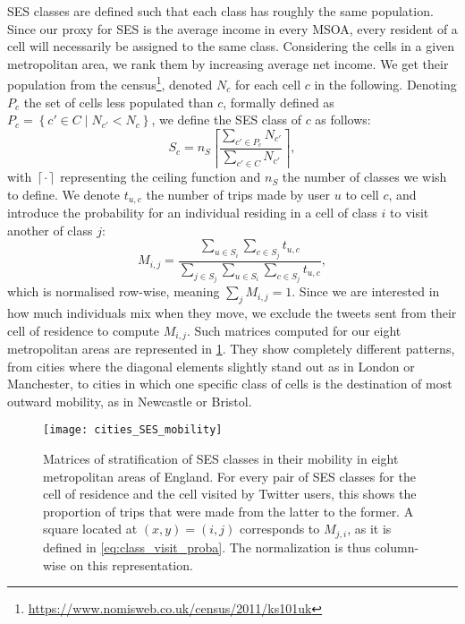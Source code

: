 \documentclass[../thesis.tex]{subfiles}
\begin{document}
\Ac{SES} classes are defined such that each class has roughly the same population. Since
our proxy for \ac{SES} is the average income in every \ac{MSOA}, every resident of a
cell will necessarily be assigned to the same class. Considering the cells in a given
metropolitan area, we rank them by increasing average net income. We get their
population from the
census\footnote{\url{https://www.nomisweb.co.uk/census/2011/ks101uk}}, denoted $N_c$ for
each cell $c$ in the following. Denoting $P_c$ the set of cells less populated than $c$,
formally defined as $P_c = \left\{ c' \in C \mid N_{c'} < N_c \right\}$, we define the
\ac{SES} class of $c$ as follows:
\begin{equation}
  S_c = n_S \left\lceil \frac{\sum_{c' \in P_c} N_{c'}}{\sum_{c' \in C} N_{c'}} \right\rceil,
\end{equation}
with $\left\lceil \cdot \right\rceil$ representing the ceiling function and $n_S$ the
number of classes we wish to define. We denote $t_{u, c}$ the number of trips made by
user $u$ to cell $c$, and introduce the probability for an individual residing in a cell
of class $i$ to visit another of class $j$:
\begin{equation}
  \label{eq:class_visit_proba}
  M_{i, j} = \frac{
      \sum_{u \in S_i} \sum_{c \in S_j} t_{u, c}
    }{
      \sum_{j \in S_j} \sum_{u \in S_i} \sum_{c \in S_j} t_{u, c}
    },
\end{equation}
which is normalised row-wise, meaning $\sum_j M_{i, j} = 1$. Since we are interested in
how much individuals mix when they move, we exclude the tweets sent from their cell of
residence to compute $M_{i, j}$. Such matrices computed for our eight metropolitan areas
are represented in \cref{fig:cities_SES_mobility}. They show completely different
patterns, from cities where the diagonal elements slightly stand out as in London or
Manchester, to cities in which one specific class of cells is the destination of most
outward mobility, as in Newcastle or Bristol.
\begin{figure}
\centering
  \texttt{[image: cities\_SES\_mobility]}
  \caption{ Matrices of stratification of \ac{SES} classes in their mobility in eight
  metropolitan areas of England. For every pair of \ac{SES} classes for the cell of
  residence and the cell visited by Twitter users, this shows the proportion of trips
  that were made from the latter to the former. A square located at $(x, y) = (i, j)$
  corresponds to $M_{j, i}$, as it is defined in \cref{eq:class_visit_proba}. The
  normalization is thus column-wise on this representation.}
  \label{fig:cities_SES_mobility}
\end{figure}
\end{document}
